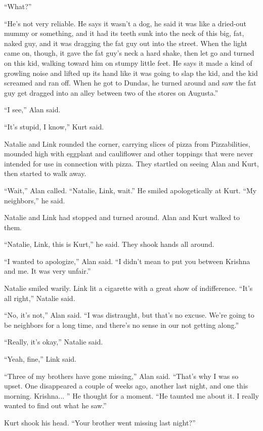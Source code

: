 ``What?''

``He's not very reliable.  He says it wasn't a dog, he said it was
like a dried-out mummy or something, and it had its teeth sunk into
the neck of this big, fat, naked guy, and it was dragging the fat guy
out into the street.  When the light came on, though, it gave the fat
guy's neck a hard shake, then let go and turned on this kid, walking
toward him on stumpy little feet.  He says it made a kind of growling
noise and lifted up its hand like it was going to slap the kid, and
the kid screamed and ran off.  When he got to Dundas, he turned around
and saw the fat guy get dragged into an alley between two of the
stores on Augusta.''

``I see,'' Alan said.

``It's stupid, I know,'' Kurt said.

Natalie and Link rounded the corner, carrying slices of pizza from
Pizzabilities, mounded high with eggplant and cauliflower and other
toppings that were never intended for use in connection with pizza. 
They startled on seeing Alan and Kurt, then started to walk away.

``Wait,'' Alan called.  ``Natalie, Link, wait.'' He smiled
apologetically at Kurt.  ``My neighbors,'' he said.

Natalie and Link had stopped and turned around.  Alan and Kurt walked
to them.

``Natalie, Link, this is Kurt,'' he said.  They shook hands all
around.

``I wanted to apologize,'' Alan said.  ``I didn't mean to put you
between Krishna and me.  It was very unfair.''

Natalie smiled warily.  Link lit a cigarette with a great show of
indifference.  ``It's all right,'' Natalie said.

``No, it's not,'' Alan said.  ``I was distraught, but that's no
excuse.  We're going to be neighbors for a long time, and there's no
sense in our not getting along.''

``Really, it's okay,'' Natalie said.

``Yeah, fine,'' Link said.

``Three of my brothers have gone missing,'' Alan said.  ``That's why I
was so upset.  One disappeared a couple of weeks ago, another last
night, and one this morning.  Krishna...  '' He thought for a moment. 
``He taunted me about it.  I really wanted to find out what he saw.''

Kurt shook his head.  ``Your brother went missing last night?''

